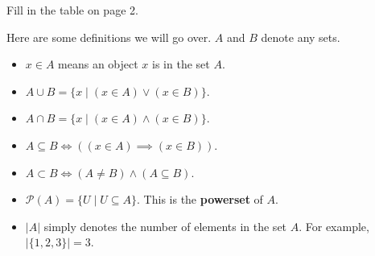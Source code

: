 Fill in the table on page 2.

Here are some definitions we will go over. $A$ and $B$ denote any sets.
\begin{itemize}
    \item $x \in A$ means an object $x$ is in the set $A$.
    \item $A \cup B = \{x \mid (x \in A) \lor (x \in B)\}$.
    \item $A \cap B = \{x \mid (x \in A) \land (x \in B)\}$.
    \item $A \subseteq B \iff ((x \in A) \implies (x \in B))$.
    \item $A \subset B \iff (A \neq B) \land (A \subseteq B)$.
    \item $\mathcal{P}(A) = \{U \mid U \subseteq A\}$. This is the \textbf{powerset} of $A$. 
    \item $|A|$ simply denotes the number of elements in the set $A$. For example, $|\{1, 2, 3\}| = 3$.
\end{itemize}